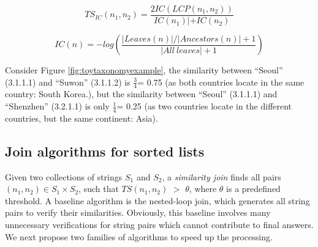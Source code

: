 \begin{equation}
TS_{IC}(n_1,n_2) = \frac{2IC(LCP(n_1,n_2))}{IC(n_1)|+IC(n_2)}
\end{equation}


\begin{equation}
IC(n) = -log (\frac{|Leaves(n)|/|Ancestors(n)|+1}{|All~leaves|+1})
\end{equation}

\begin{example}
Consider Figure \ref{fig:toytaxonomyexample}, the similarity between ``\textsf{Seoul}'' (3.1.1.1) and ``\textsf{Suwon}'' (3.1.1.2) is $\frac{3}{4}$= 0.75 (as both countries locate in the same country: South Korea.), but the similarity between ``\textsf{Seoul}''  (3.1.1.1) and ``\textsf{Shenzhen}'' (3.2.1.1) is only $\frac{1}{4}$= 0.25 (as two countries locate in the different countries, but the same continent: Asia).
\end{example}




\subsection{Join algorithms for sorted lists}

Given two collections of strings $S_1$ and $S_2$,  a \textit{similarity join} finds all pairs $(n_1, n_2) \in S_1 \times S_2$,
such that $TS(n_1,n_2)$ $>$ $\theta$, where $\theta$ is a predefined threshold. A baseline algorithm is the nested-loop join, which generates all string pairs to verify their similarities.  Obviously, this baseline involves many unnecessary verifications for string pairs which cannot contribute to final answers. We next propose two families of algorithms to speed up the processing.

